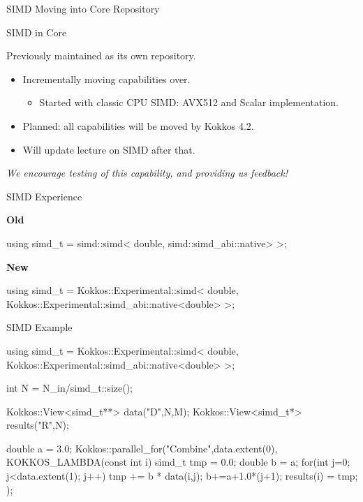 \begin{frame}[fragile]

  {\Huge SIMD Moving into Core Repository}

\end{frame}

\begin{frame}[fragile]{SIMD in Core}

  {\large Previously maintained as its own repository.}
  \vspace{10pt}

  \begin{itemize}
    \item {Incrementally moving capabilities over.}
    \begin{itemize}
      \item {Started with classic CPU SIMD: AVX512 and Scalar implementation.}
    \end{itemize}
    \item {Planned: all capabilities will be moved by Kokkos 4.2.}
    \item {Will update lecture on SIMD after that.}
  \end{itemize}

  \vspace{5pt}
  {\large \textit{We encourage testing of this capability, and providing us feedback!}}
\end{frame}

\begin{frame}[fragile]{SIMD Experience}

\textbf{Old}
\begin{code}
  using simd_t = simd::simd<
     double, simd::simd_abi::native>
  >;
\end{code}

\vspace{10pt}
\textbf{New}
\begin{code}
  using simd_t = Kokkos::Experimental::simd<
     double,
     Kokkos::Experimental::simd_abi::native<double>
  >;
\end{code}
\end{frame}

\begin{frame}[fragile]{SIMD Example}

\begin{code}
  using simd_t = Kokkos::Experimental::simd<
     double,
     Kokkos::Experimental::simd_abi::native<double>
  >;

  int N = N_in/simd_t::size();

  Kokkos::View<simd_t**> data("D",N,M);
  Kokkos::View<simd_t*> results("R",N);

  double a = 3.0;
  Kokkos::parallel_for("Combine",data.extent(0), KOKKOS_LAMBDA(const int i) {
    simd_t tmp = 0.0;
    double b = a;
    for(int j=0; j<data.extent(1); j++) {
      tmp += b * data(i,j);
      b+=a+1.0*(j+1);
    }
    results(i) = tmp;
  });
\end{code}

\end{frame}
